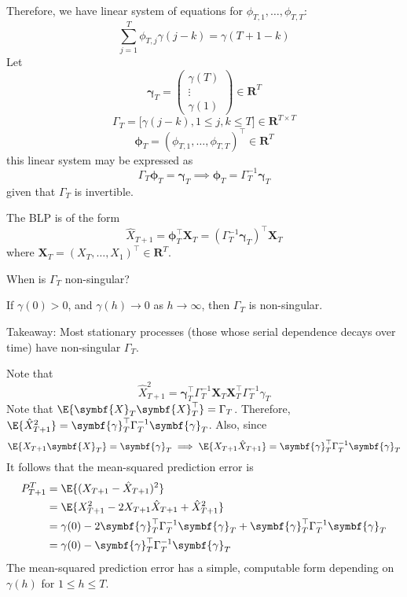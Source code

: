 Therefore, we have linear system of equations for $ \phi_{T,1},\ldots,\phi_{T,T} $:
\[ \sum_{j=1}^{T}\phi_{T,j}\gamma(j-k)=\gamma(T+1-k)  \]
Let
\[ \symbf{\gamma}_T=\begin{pmatrix}
        \gamma(T) \\
        \vdots    \\
        \gamma(1)
    \end{pmatrix}\in\mathbf{R}^T \]
\[ \Gamma_T=\bigl[\gamma(j-k),1\le j,k\le T\bigr]\in\mathbf{R}^{T\times T} \]
\[ \symbf{\phi}_T=(\phi_{T,1},\ldots,\phi_{T,T})^\top \in\mathbf{R}^T \]
this linear system may be expressed as
\[ \Gamma_T \symbf{\phi}_T=\symbf{\gamma}_T\implies \symbf{\phi}_T=\Gamma_T^{-1}\symbf{\gamma}_T \]
given that $ \Gamma_T $ is invertible.

The BLP is of the form
\[ \hat{X}_{T+1}=\symbf{\phi}_T^\top \symbf{X}_T=(\Gamma_T^{-1}\symbf{\gamma}_T)^\top \symbf{X}_T \]
where $ \symbf{X}_T=(X_{T},\ldots,X_1)^\top\in \mathbf{R}^T $.

When is $ \Gamma_T $ non-singular?
\begin{Theorem}{}{}
    If $ \gamma(0)>0 $, and $ \gamma(h)\to 0 $ as $ h\to\infty $, then
    $ \Gamma_T $ is non-singular.
\end{Theorem}
Takeaway: Most stationary processes (those whose serial dependence decays
over time) have non-singular $ \Gamma_T $.

Note that
\[ \hat{X}_{T+1}^2=\symbf{\gamma}_T^\top \Gamma_T^{-1}\symbf{X}_T \symbf{X}_T^\top
    \Gamma_T^{-1}\gamma_T \]
Note that $ \E{\symbf{X}_T \symbf{X}_T^\top}=\Gamma_T $.
Therefore, $ \E{\hat{X}_{T+1}^2}=\symbf{\gamma}_T^\top \Gamma_T^{-1} \symbf{\gamma}_T $.
Also, since
\[ \E{X_{T+1}\symbf{X}_T}=\symbf{\gamma}_T\implies
    \E{X_{T+1}\hat{X}_{T+1}}=\symbf{\gamma}_T^\top \Gamma_T^{-1}\symbf{\gamma}_T \]
It follows that the mean-squared prediction error is
\begin{align*}
    P_{T+1}^T
     & =\E{(X_{T+1}-\hat{X}_{T+1})^2}                                                                                       \\
     & =\E{X_{T+1}^2-2 X_{T+1}\hat{X}_{T+1}+\hat{X}_{T+1}^2}                                                                \\
     & =\gamma(0)-2 \symbf{\gamma}_T^\top \Gamma_T^{-1}\symbf{\gamma}_T+\symbf{\gamma}_T^\top \Gamma_T^{-1}\symbf{\gamma}_T \\
     & =\gamma(0)-\symbf{\gamma}_T^\top\Gamma_T^{-1}\symbf{\gamma}_T
\end{align*}
The mean-squared prediction error has a simple, computable
form depending on $ \gamma(h) $ for $ 1\le h\le T $.

